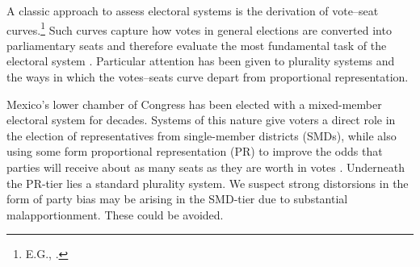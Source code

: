 \documentclass[letter,12pt]{article}
\begin{document}
\onehalfspacing




\noindent A classic approach to assess electoral systems is the derivation of vote--seat curves.\footnote{E.G., \citet{rae.1967,tufte1973seatsVotes,erikson1972malapportionment,dahl.1956prefDemoc,gudgin.taylor.1979seatsVotes,taagepera.shugart.1989,taagepera.CubeLaw.1973,king.1990elRespBiasMultiparty,king.browning1987biasRespUS,gelman.king.1994EvalElSysRedis}.} Such curves capture how votes in general elections are converted into parliamentary seats and therefore evaluate the most fundamental task of the electoral system \citep{lijphartElSysPtySys.1994}. Particular attention has been given to plurality systems and the ways in which the votes--seats curve depart from proportional representation. 

Mexico's lower chamber of Congress has been elected with a mixed-member electoral system for decades. Systems of this nature give voters a direct role in the election of representatives from single-member districts (SMDs), while also using some form proportional representation (PR) to improve the odds that parties will receive about as many seats as they are worth in votes \citep{shugart.wattenbergIntro2001}. Underneath the PR-tier lies a standard plurality system. We suspect strong distorsions in the form of party bias may be arising in the SMD-tier due to substantial malapportionment. These could be avoided. 
\end{document}
